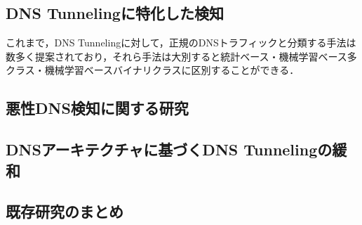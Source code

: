 \documentclass[12pt]{jarticle} %
\begin{document}
\subsection{DNS Tunnelingに特化した検知}
これまで，DNS Tunnelingに対して，正規のDNSトラフィックと分類する手法は数多く提案されており，それら手法は大別すると統計ベース・機械学習ベース多クラス・機械学習ベースバイナリクラスに区別することができる．

\subsection{悪性DNS検知に関する研究}
\subsection{DNSアーキテクチャに基づくDNS Tunnelingの緩和}
\subsection{既存研究のまとめ}
\end{document}
